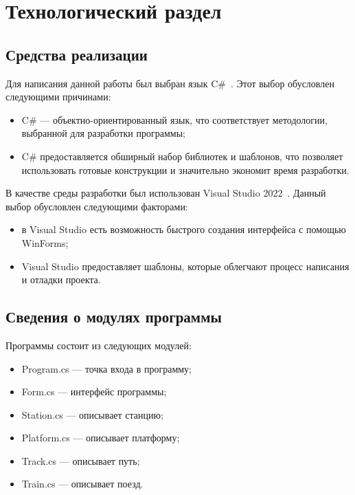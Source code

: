 \section{Технологический раздел}
\subsection{Средства реализации}
Для написания данной работы был выбран язык C\#~\cite{cpp-lang}.
Этот выбор обусловлен следующими причинами:
\begin{itemize}
	\item C\# --- объектно-ориентированный язык, что соответствует методологии, выбранной для разработки программы;
	\item C\# предоставляется обширный набор библиотек и шаблонов, что позволяет использовать готовые конструкции и значительно экономит время разработки.
\end{itemize}

В качестве среды разработки был использован Visual Studio 2022~\cite{qt-creator}.
Данный выбор обусловлен следующими факторами:
\begin{itemize}
	\item в Visual Studio есть возможность быстрого создания интерфейса с помощью WinForms;
	\item Visual Studio предоставляет шаблоны, которые облегчают процесс написания и отладки проекта.
\end{itemize}

\subsection{Сведения о модулях программы}
Программы состоит из следующих модулей:
\begin{itemize}
	\item Program.cs --- точка входа в программу;
	\item Form.cs --- интерфейс программы;
	\item Station.cs --- описывает станцию;
	\item Platform.cs --- описывает платформу;
	\item Track.cs --- описывает путь;
	\item Train.cs --- описывает поезд.
\end{itemize}

